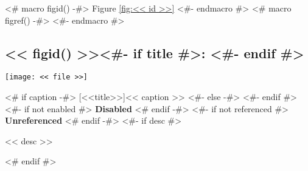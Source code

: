 <# macro figid() -#>
Figure \ref{fig:<< id >>}
<#- endmacro #>
<# macro figref() -#>
\color{light-gray}
<#- endmacro #>

\begin{samepage}
\subsection[<< figid() >>~~~<< figref() >>~~~<#- if title #>\textit{<< title >>}<#- endif #>]%
  {<< figid() >><#- if title #>:  \hfill \figref{}<#- endif #>}
\nopagebreak
\noindent\centerline{\texttt{[image: << file >>]}}
<# if caption -#>
\nopagebreak
{}[<<title>>]{<< caption >>}
<#- else -#>
<#- endif #>\label{fig:<< id >>}
<#- if not enabled #>
{\color{red}\textbf{Disabled}}
<# endif -#>
<#- if not referenced #>
{\color{red}\textbf{Unreferenced}}
<# endif -#>
<#- if desc #>
\nopagebreak
\begin{figinfo}<< desc >>\end{figinfo}
<# endif #>
\end{samepage}
\vspace{20pt}
